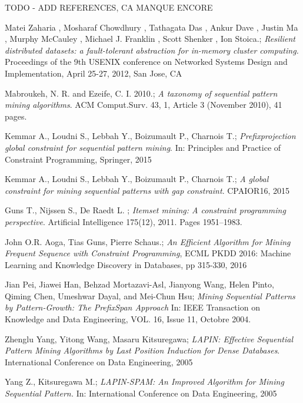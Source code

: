 \documentclass{eplmastersthesis}
\begin{document}
TODO - ADD REFERENCES, CA MANQUE ENCORE
\begin{thebibliography}{9}
Matei Zaharia , Mosharaf Chowdhury , Tathagata Das , Ankur Dave , Justin Ma , Murphy McCauley , Michael J. Franklin , Scott Shenker , Ion Stoica.;
\textit{Resilient distributed datasets: a fault-tolerant abstraction for in-memory cluster computing.}
Proceedings of the 9th USENIX conference on Networked Systems Design and Implementation, April 25-27, 2012, San Jose, CA

Mabroukeh, N. R. and Ezeife, C. I. 2010.;
\textit{A taxonomy of sequential pattern mining algorithms}. 
ACM Comput.Surv. 43, 1, Article 3 (November 2010), 41 pages.

Kemmar A., Loudni S., Lebbah Y., Boizumault P., Charnois T.;
\textit{Prefixprojection global constraint for sequential pattern mining}.
In: Principles and Practice of Constraint Programming, Springer, 2015

Kemmar A., Loudni S., Lebbah Y., Boizumault P., Charnois T.;
\textit{A global constraint for mining sequential patterns with gap constraint}.
CPAIOR16, 2015

Guns T., Nijssen S., De Raedt L. ;
\textit{Itemset mining: A constraint programming perspective}. 
Artificial Intelligence 175(12), 2011. Pages 1951–1983.

John O.R. Aoga, Tias Guns, Pierre Schaus.;
\textit{An Efficient Algorithm for Mining Frequent Sequence with Constraint Programming},
ECML PKDD 2016: Machine Learning and Knowledge Discovery in Databases, pp 315-330, 2016

Jian Pei, Jiawei Han, Behzad Mortazavi-Asl, Jianyong Wang, Helen Pinto, Qiming Chen, Umeshwar Dayal, and Mei-Chun Hsu;
\textit{Mining Sequential Patterns by Pattern-Growth:
The PrefixSpan Approach}
In: IEEE Transaction on Knowledge and Data Engineering, VOL. 16, Issue 11, Octobre 2004.

Zhenglu Yang, Yitong Wang, Masaru Kitsuregawa;
\textit{LAPIN: Effective Sequential Pattern Mining Algorithms
by Last Position Induction for Dense Databases}.
International Conference on Data Engineering, 2005

Yang Z., Kitsuregawa M.;
\textit{LAPIN-SPAM: An Improved Algorithm for Mining
Sequential Pattern.}
In: International Conference on Data Engineering, 2005


\end{thebibliography}
\end{document}
